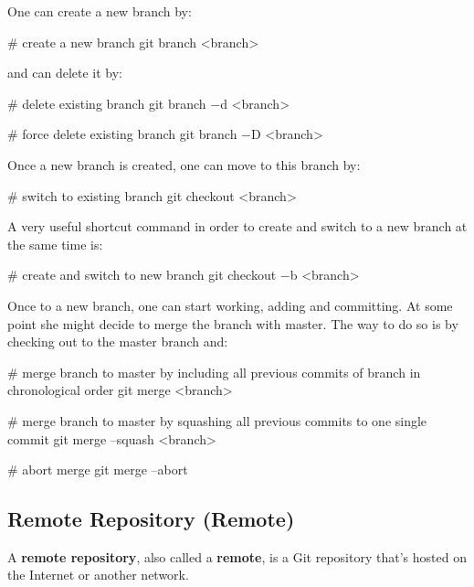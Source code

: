 One can create a new branch by:

\begin{bash}
# create a new branch
git branch <branch>
\end{bash}

and can delete it by:

\begin{bash}
# delete existing branch
git branch $-$d <branch>
\end{bash}

\begin{bash}
# force delete existing branch
git branch $-$D <branch>
\end{bash}

Once a new branch is created, one can move to this branch by:

\begin{bash}
# switch to existing branch
git checkout <branch>
\end{bash}

A very useful shortcut command in order to create and switch to a new branch at the same time is:

\begin{bash}
# create and switch to new branch
git checkout $-$b <branch>
\end{bash}

Once to a new branch, one can start working, adding and committing. At some point she might decide to merge the
branch with master. The way to do so is by checking out to the master branch and:

\begin{bash}
# merge branch to master by including all previous commits of branch in chronological order
git merge <branch>
\end{bash}

\begin{bash}
# merge branch to master by squashing all previous commits to one single commit
git merge --squash <branch>
\end{bash}

\begin{bash}
# abort merge
git merge --abort
\end{bash}

\subsection{Remote Repository (Remote)}

A \textbf{remote repository}, also called a \textbf{remote}, is a Git repository that's hosted on the Internet or
another network.
\ed

